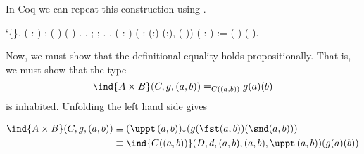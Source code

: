 In Coq we can repeat this construction using . \begin{coqdoccode}
\coqdocemptyline
\coqdocnoindent
{} `\{\}.\coqdoceol
\coqdocemptyline
\coqdocnoindent
{}  ( : ) :  ( ) ( ) \coqdocnotation{=} .\coqdoceol
\coqdocnoindent
{} .\coqdoceol
\coqdocnoindent
{} ;  ; .\coqdoceol
\coqdocnoindent
{}.\coqdoceol
\coqdocemptyline
\coqdocnoindent
{}  ( :   ) ( : \coqdockw{\ensuremath{\forall}} (:) (:),  (  )) ( : ) := \coqdoceol
\coqdocnoindent
\coqdocnotation{(} \coqdocnotation{)} \coqdocnotation{\#} \coqdocnotation{(} ( ) ( )\coqdocnotation{)}.\coqdoceol
\coqdocemptyline
\end{coqdoccode}


Now, we must show that the definitional equality holds propositionally.  That
is, we must show that the type
\[
  \ind{A \times B}(C, g, (a, b)) =_{C((a, b))} g(a)(b)
\]
is inhabited.  Unfolding the left hand side gives


\begin{align*}
  \ind{A \times B}(C, g, (a, b))
  &\equiv
  (\uppt\, (a, b))_{*}(g(\fst (a, b))(\snd (a, b)))
  \\&\equiv
  \ind{C((a, b))}(D, d, (a, b), (a, b), \uppt\, (a, b))(g(a)(b))
\end{align*}


